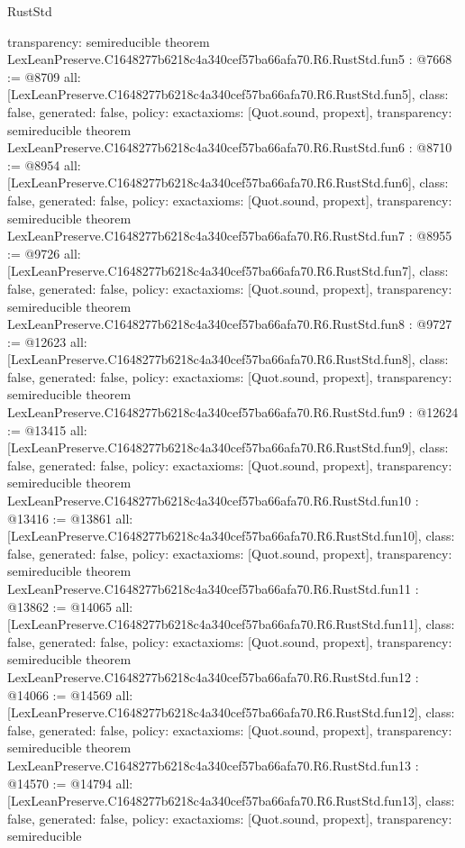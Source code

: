 \begin{lexlean}{RustStd}
\begin{coremodule}
{  transparency: semireducible
}
theorem LexLeanPreserve.C1648277b6218c4a340cef57ba66afa70.R6.RustStd.fun5 : @7668 := @8709 {
  all: [LexLeanPreserve.C1648277b6218c4a340cef57ba66afa70.R6.RustStd.fun5],
  class: false,
  generated: false,
  policy: exact{axioms: [Quot.sound, propext]},
  transparency: semireducible
}
theorem LexLeanPreserve.C1648277b6218c4a340cef57ba66afa70.R6.RustStd.fun6 : @8710 := @8954 {
  all: [LexLeanPreserve.C1648277b6218c4a340cef57ba66afa70.R6.RustStd.fun6],
  class: false,
  generated: false,
  policy: exact{axioms: [Quot.sound, propext]},
  transparency: semireducible
}
theorem LexLeanPreserve.C1648277b6218c4a340cef57ba66afa70.R6.RustStd.fun7 : @8955 := @9726 {
  all: [LexLeanPreserve.C1648277b6218c4a340cef57ba66afa70.R6.RustStd.fun7],
  class: false,
  generated: false,
  policy: exact{axioms: [Quot.sound, propext]},
  transparency: semireducible
}
theorem LexLeanPreserve.C1648277b6218c4a340cef57ba66afa70.R6.RustStd.fun8 : @9727 := @12623 {
  all: [LexLeanPreserve.C1648277b6218c4a340cef57ba66afa70.R6.RustStd.fun8],
  class: false,
  generated: false,
  policy: exact{axioms: [Quot.sound, propext]},
  transparency: semireducible
}
theorem LexLeanPreserve.C1648277b6218c4a340cef57ba66afa70.R6.RustStd.fun9 : @12624 := @13415 {
  all: [LexLeanPreserve.C1648277b6218c4a340cef57ba66afa70.R6.RustStd.fun9],
  class: false,
  generated: false,
  policy: exact{axioms: [Quot.sound, propext]},
  transparency: semireducible
}
theorem LexLeanPreserve.C1648277b6218c4a340cef57ba66afa70.R6.RustStd.fun10 : @13416 := @13861 {
  all: [LexLeanPreserve.C1648277b6218c4a340cef57ba66afa70.R6.RustStd.fun10],
  class: false,
  generated: false,
  policy: exact{axioms: [Quot.sound, propext]},
  transparency: semireducible
}
theorem LexLeanPreserve.C1648277b6218c4a340cef57ba66afa70.R6.RustStd.fun11 : @13862 := @14065 {
  all: [LexLeanPreserve.C1648277b6218c4a340cef57ba66afa70.R6.RustStd.fun11],
  class: false,
  generated: false,
  policy: exact{axioms: [Quot.sound, propext]},
  transparency: semireducible
}
theorem LexLeanPreserve.C1648277b6218c4a340cef57ba66afa70.R6.RustStd.fun12 : @14066 := @14569 {
  all: [LexLeanPreserve.C1648277b6218c4a340cef57ba66afa70.R6.RustStd.fun12],
  class: false,
  generated: false,
  policy: exact{axioms: [Quot.sound, propext]},
  transparency: semireducible
}
theorem LexLeanPreserve.C1648277b6218c4a340cef57ba66afa70.R6.RustStd.fun13 : @14570 := @14794 {
  all: [LexLeanPreserve.C1648277b6218c4a340cef57ba66afa70.R6.RustStd.fun13],
  class: false,
  generated: false,
  policy: exact{axioms: [Quot.sound, propext]},
  transparency: semireducible
}
\end{coremodule}
\end{lexlean}
